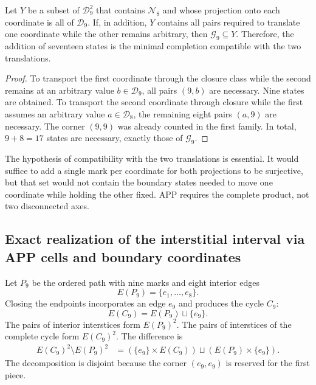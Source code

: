 \begin{proposition}
\label{p12-83-c1-s2:prop:app-minimalidad-completacion}
Let \(Y\) be a subset of \(\mathcal D_9^2\) that contains \(\mathcal N_8\) and whose projection onto each coordinate is all of \(\mathcal D_9\). If, in addition, \(Y\) contains all pairs required to translate one coordinate while the other remains arbitrary, then \(\mathcal G_9\subseteq Y\). Therefore, the addition of seventeen states is the minimal completion compatible with the two translations.
\end{proposition}

\begin{proof}
To transport the first coordinate through the closure class while
the second remains at an arbitrary value \(b\in\mathcal D_9\), all
pairs \((9,b)\) are necessary. Nine states are obtained. To
transport the second coordinate through closure while the first assumes
an arbitrary value \(a\in\mathcal D_8\), the remaining eight pairs
\((a,9)\) are necessary. The corner \((9,9)\) was already counted in the first
family. In total, \(9+8=17\) states are necessary, exactly those of
\(\mathcal G_9\).
\end{proof}

The hypothesis of compatibility with the two translations is essential. It would suffice
to add a single mark per coordinate for both projections to be
surjective, but that set would not contain the boundary states
needed to move one coordinate while holding the other fixed. APP requires the
complete product, not two disconnected axes.

\subsection{Exact realization of the interstitial interval via APP cells and boundary coordinates}

Let \(P_9\) be the ordered path with nine marks and eight interior edges
\[
 E(P_9)=\{e_1,\ldots,e_8\}.
\]
Closing the endpoints incorporates an edge \(e_9\) and produces the cycle
\(C_9\):
\[
 E(C_9)=E(P_9)\sqcup\{e_9\}.
\]
The pairs of interior interstices form \(E(P_9)^2\). The pairs of
interstices of the complete cycle form \(E(C_9)^2\). The difference is
\begin{align}
 E(C_9)^2\setminus E(P_9)^2
   &=(\{e_9\}\times E(C_9))
     \sqcup(E(P_9)\times\{e_9\}).
\label{p12-83-c1-s2:eq:app-complemento-intersticial}
\end{align}
The decomposition is disjoint because the corner \((e_9,e_9)\) is reserved for
the first piece.

